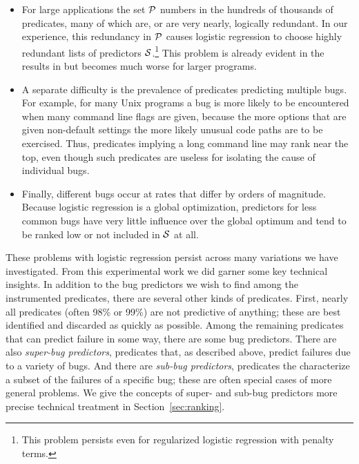 \documentclass[draft]{sig-alternate}
\begin{document}
\begin{itemize}

\item For large applications the set ${\cal P}$ numbers in the hundreds of
thousands of predicates, many of which are, or are very nearly,
logically redundant.  In our experience, this redundancy in ${\cal P}$
causes logistic regression to choose highly redundant lists of
predictors ${\cal S}$.\footnote{This problem persists even for
regularized logistic regression with penalty terms.}  This problem is
already evident in the results in \cite{PLDI`03*141} but becomes much
worse for larger programs.

\item A separate difficulty is the prevalence of predicates predicting
multiple bugs.  For example, for many Unix programs a bug is more
likely to be encountered when many command line flags are given,
because the more options that are given non-default settings the more
likely unusual code paths are to be exercised.  Thus, predicates
implying a long command line may rank near the top, even though such
predicates are useless for isolating the cause of individual bugs.

\item Finally, different bugs occur at rates that differ by orders of
magnitude.  Because logistic regression is a global optimization,
predictors for less common bugs have very little influence over the
global optimum and tend to be ranked low or not included in ${\cal S}$
at all.

\end{itemize}

These problems with logistic regression persist across many variations
we have investigated. From this experimental work we did garner some
key technical insights.  In addition to the bug predictors we wish to
find among the instrumented predicates, there are several other kinds
of predicates.  First, nearly all predicates (often 98\% or 99\%) are
not predictive of anything; these are best identified and discarded as
quickly as possible. Among the remaining predicates that can
predict failure in some way, there are some bug predictors.
There are also {\em super-bug predictors}, predicates that, as
described above, predict failures due to a variety of bugs.  And there
are {\em sub-bug predictors}, predicates the characterize a subset of
the failures of a specific bug; these are often special cases of more
general problems.  We give the concepts of super- and sub-bug
predictors more precise technical treatment in
Section~\ref{sec:ranking}.
\end{document}
